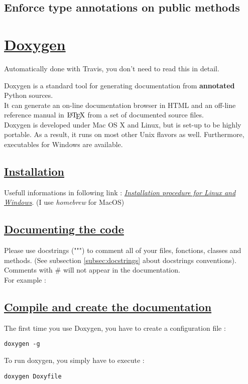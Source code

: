 \documentclass[a4paper]{report}
\begin{document}
\subsection{Enforce type annotations on public methods}

\section{\href{http://www.stack.nl/~dimitri/doxygen/manual/index.html}{Doxygen}}
\begin{large}
Automatically done with Travis, you don't need to read this in detail.\\
\end{large}
Doxygen is a standard tool for generating documentation from \textbf{annotated} Python sources.\\
It can generate an on-line documentation browser in HTML and an off-line reference manual in $\mbox{\LaTeX}$ from a set of documented source files. \\
Doxygen is developed under Mac OS X and Linux, but is set-up to be highly portable. As a result, it runs on most other Unix flavors as well. Furthermore, executables for Windows are available.

\subsection{\href{http://www.stack.nl/~dimitri/doxygen/manual/install.html}{Installation}\\}
Usefull informations in following link  : \href{http://www.stack.nl/~dimitri/doxygen/manual/install.html}{\textit{Installation procedure for Linux and Windows}}. (I use \textit{homebrew} for MacOS)

\subsection{\href{http://www.stack.nl/~dimitri/doxygen/manual/docblocks.html\#pythonblocks}{Documenting the code}\\}
Please use docstrings (""") to comment all of your files, fonctions, classes and methods. (See subsection \ref{subsec:docstrings} about docstrings conventions).  Comments with \# will not appear in the documentation. \\ 
For example : \\


\subsection{\href{http://www.stack.nl/~dimitri/doxygen/manual/starting.html}{Compile and create the documentation}\\}
The first time you use Doxygen, you have to create a configuration file : 
\begin{verbatim}
doxygen -g
\end{verbatim}
To run doxygen, you simply have to execute : 
\begin{verbatim}
doxygen Doxyfile
\end{verbatim}
\end{document}
